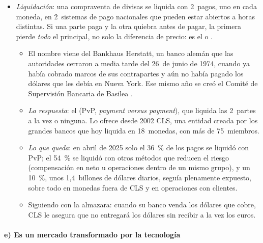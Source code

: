 \documentclass[11pt]{article}
\begin{document}
\begin{itemize}
\begin{itemize}
  \item en Estados Unidos, la ley Dodd-Frank (2010) permitió al Tesoro excluir de la definición de \emph{swap} a los FX \emph{swaps} y a los \emph{forwards} con entrega, lo que hizo en noviembre de 2012: quedaron fuera de la compensación y de la negociación obligatorias, aunque no de la obligación de comunicarlos\nocite{DoddFrank2010,Tesoro2012FXSwaps}. Las opciones, los \emph{currency swaps} y los \emph{forwards} sin entrega sí son \emph{swaps} a esos efectos; el contado nunca lo fue.
  \end{itemize}
\item \emph{Liquidación}: una compraventa de divisas se liquida con 2~pagos, uno en cada moneda, en 2~sistemas de pago nacionales que pueden estar abiertos a horas distintas. Si una parte paga y la otra quiebra antes de pagar, la primera pierde \emph{todo} el principal, no solo la diferencia de precio: es el  o .
  \begin{itemize}
  \item El nombre viene del Bankhaus Herstatt, un banco alemán que las autoridades cerraron a media tarde del 26~de junio de 1974, cuando ya había cobrado marcos de sus contrapartes y aún no había pagado los dólares que les debía en Nueva York\nocite{CPSS1996Settlement,BIS2019Liquidacion}. Ese mismo año se creó el Comité de Supervisión Bancaria de Basilea .
  \item \emph{La respuesta}: el  (PvP, \emph{payment versus payment}), que liquida las 2~partes a la vez o ninguna. Lo ofrece desde 2002 CLS, una entidad creada por los grandes bancos que hoy liquida en 18~monedas, con más de 75~miembros\nocite{CLS2026About}.
  \item \emph{Lo que queda}: en abril de 2025 solo el 36~\% de los pagos se liquidó con PvP; el 54~\% se liquidó con otros métodos que reducen el riesgo (compensación en neto u operaciones dentro de un mismo grupo), y un 10~\%, unos 1,4~billones de dólares diarios, seguía plenamente expuesto, sobre todo en monedas fuera de CLS y en operaciones con clientes\nocite{Drehmann2026Liquidacion}.
  \item Siguiendo con la almazara: cuando su banco venda los dólares que cobre, CLS le asegura que no entregará los dólares sin recibir a la vez los euros.
  \end{itemize}
\end{itemize}

\paragraph{e) Es un mercado transformado por la tecnología}
\end{document}
